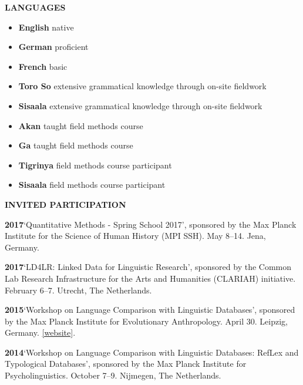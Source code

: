 \documentclass[11pt]{article}
\newcommand{\hangpara}{
 \setlength{\parindent}{0in} %
 \hangindent=0.42in %
}
\begin{document}
\vskip 10pt
\begin{flushleft}
{\bf LANGUAGES}
\end{flushleft}
\begin{itemize}
\item {\bf English} native
\item {\bf German} proficient
\item {\bf French} basic
\item {\bf Toro So} extensive grammatical knowledge through on-site fieldwork
\item {\bf Sisaala} extensive grammatical knowledge through on-site fieldwork
\item {\bf Akan} taught field methods course
\item {\bf Ga} taught field methods course
\item {\bf Tigrinya} field methods course participant
\item {\bf Sisaala} field methods course participant
\end{itemize}


\vskip 10pt
\begin{flushleft}
{\bf INVITED PARTICIPATION}
\end{flushleft}

\hangpara
{\bf 2017}\hspace{1ex}`Quantitative Methods - Spring School 2017', sponsored by the Max Planck Institute for the Science of Human History (MPI SSH). May 8--14. Jena, Germany.

\hangpara
\vskip 6pt
{\bf 2017}\hspace{1ex}`LD4LR: Linked Data for Linguistic Research', sponsored by the Common Lab Research Infrastructure for the Arts and Humanities (CLARIAH) initiative. February 6--7. Utrecht, The Netherlands. %

\hangpara
\vskip 6pt
{\bf 2015}\hspace{1ex}`Workshop on Language Comparison with Linguistic Databases', sponsored by the Max Planck Institute for Evolutionary Anthropology. April 30. Leipzig, Germany. \href{https://www.eva.mpg.de/linguistics/conferences/2014-ws-lanclid2/index.html}{[website]}.

\hangpara
\vskip 6pt
{\bf 2014}\hspace{1ex}`Workshop on Language Comparison with Linguistic Databases: RefLex and Typological Databases', sponsored by the Max Planck Institute for Psycholinguistics. October 7--9. Nijmegen, The Netherlands. 
\end{document}
